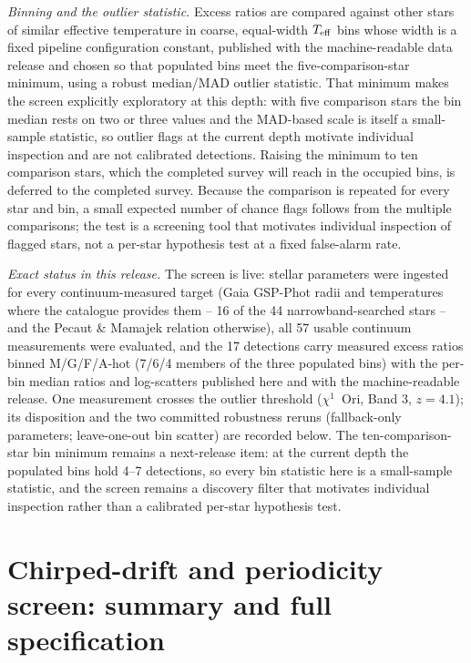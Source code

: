 \documentclass{openjournal}
\begin{document}
\emph{Binning and the outlier statistic.} Excess ratios are compared
against other stars of similar effective temperature in coarse,
equal-width $T_{\rm eff}$ bins whose width is a fixed pipeline
configuration constant, published with the machine-readable data
release and chosen so that populated bins meet the
five-comparison-star minimum, using a robust median/MAD outlier
statistic. That minimum makes the screen explicitly exploratory at
this depth: with five comparison stars the bin median rests on two or
three values and the MAD-based scale is itself a small-sample
statistic, so outlier flags at the current depth motivate individual
inspection and are not calibrated detections. Raising the minimum to
ten comparison stars, which the completed survey will reach in the
occupied bins, is deferred to the completed survey. Because the
comparison is repeated for every star and bin, a small expected number
of chance flags follows from the multiple comparisons; the test is a
screening tool that motivates individual inspection of flagged stars,
not a per-star hypothesis test at a fixed false-alarm rate.

\emph{Exact status in this release.} The screen is live: stellar
parameters were ingested for every continuum-measured target (Gaia
GSP-Phot radii and temperatures where the catalogue provides them --
16 of the 44 narrowband-searched stars -- and the Pecaut \& Mamajek
relation otherwise), all 57 usable continuum measurements were
evaluated, and the 17 detections carry measured excess ratios binned
M/G/F/A-hot (7/6/4 members of the three populated bins) with the
per-bin median ratios and log-scatters published here and with the
machine-readable release. One
measurement crosses the outlier threshold ($\chi^1$~Ori, Band 3,
$z=4.1$); its disposition and the two committed robustness reruns
(fallback-only parameters; leave-one-out bin scatter) are recorded
below. The ten-comparison-star bin minimum remains a
next-release item: at the current depth the populated bins hold 4--7
detections, so every bin statistic here is a small-sample statistic,
and the screen remains a discovery filter that motivates individual
inspection rather than a calibrated per-star hypothesis test.

\section{Chirped-drift and periodicity screen: summary and full specification}
\label{app:extended}
\end{document}
